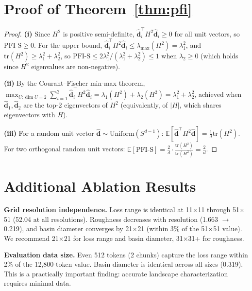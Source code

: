 \documentclass{article}
\begin{document}
\section{Proof of Theorem~\ref{thm:pfi}}
\label{app:proof_pfi}

\begin{proof}
\textbf{(i)} Since $H^2$ is positive semi-definite, $\hat{\mathbf{d}}_i^\top H^2 \hat{\mathbf{d}}_i \geq 0$ for all unit vectors, so $\mathrm{PFI\text{-}S} \geq 0$. For the upper bound, $\hat{\mathbf{d}}_i^\top H^2 \hat{\mathbf{d}}_i \leq \lambda_{\max}(H^2) = \lambda_1^2$, and $\mathrm{tr}(H^2) \geq \lambda_1^2 + \lambda_2^2$, so $\mathrm{PFI\text{-}S} \leq 2\lambda_1^2 / (\lambda_1^2 + \lambda_2^2) \leq 1$ when $\lambda_2 \geq 0$ (which holds since $H^2$ eigenvalues are non-negative).

\textbf{(ii)} By the Courant--Fischer min-max theorem, $\max_{U: \dim U = 2} \sum_{i=1}^{2} \hat{\mathbf{d}}_i^\top H^2 \hat{\mathbf{d}}_i = \lambda_1(H^2) + \lambda_2(H^2) = \lambda_1^2 + \lambda_2^2$, achieved when $\hat{\mathbf{d}}_1, \hat{\mathbf{d}}_2$ are the top-2 eigenvectors of $H^2$ (equivalently, of $|H|$, which shares eigenvectors with $H$).

\textbf{(iii)} For a random unit vector $\hat{\mathbf{d}} \sim \mathrm{Uniform}(S^{d-1})$: $\mathbb{E}[\hat{\mathbf{d}}^\top H^2 \hat{\mathbf{d}}] = \frac{1}{d}\mathrm{tr}(H^2)$. For two orthogonal random unit vectors: $\mathbb{E}[\mathrm{PFI\text{-}S}] = \frac{2}{d} \cdot \frac{\mathrm{tr}(H^2)}{\mathrm{tr}(H^2)} = \frac{2}{d}$.
\end{proof}

\section{Additional Ablation Results}
\label{app:ablations}

\textbf{Grid resolution independence.} Loss range is identical at 11$\times$11 through 51$\times$51 (52.04 at all resolutions). Roughness decreases with resolution (1.663 $\to$ 0.219), and basin diameter converges by 21$\times$21 (within 3\% of the 51$\times$51 value). We recommend 21$\times$21 for loss range and basin diameter, 31$\times$31+ for roughness.

\textbf{Evaluation data size.} Even 512 tokens (2 chunks) capture the loss range within 2\% of the 12,800-token value. Basin diameter is identical across all sizes (0.319). This is a practically important finding: accurate landscape characterization requires minimal data.
\end{document}
